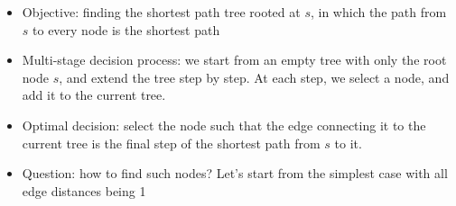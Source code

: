 \documentclass[mathserif]{beamer}
\begin{document}
{	\begin{itemize}
		\item Objective: finding the shortest path tree rooted at $s$, in which the path from $s$ to every node is the shortest path 
		 
		\item Multi-stage decision process: we start from an empty tree with only the root node $s$, and extend the tree step by step. At each step, we select a node, and add it to the current tree. 
		\item Optimal decision: select the node such that the edge connecting it to the current tree is the final step of the shortest path from $s$ to it.  
		\item Question: how to find such nodes? Let's start from the simplest case with all edge distances being 1 
	\end{itemize}

}
\end{document}

